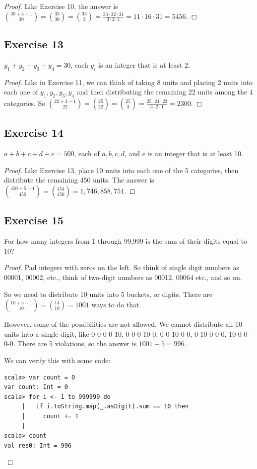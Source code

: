 \documentclass[14pt]{extarticle}
\begin{document}
\begin{proof}
     Like Exercise 10, the answer is \(\binom{30+4-1}{30} = \binom{33}{30} = \binom{33}{3} = \frac{33 \cdot 32 \cdot 31}{3
          \cdot 2 \cdot 1} = 11 \cdot 16 \cdot 31 = 5456\).
\end{proof}

\subsection{Exercise 13}
\(y_1 + y_2 + y_3 + y_4 = 30\), each \(y_i\) is an integer that is at least 2.

\begin{proof}
     Like in Exercise 11, we can think of taking 8 units and placing 2 units into each one of \(y_1,y_2,y_3,y_4\) and then
     distributing the remaining 22 units among the 4 categories. So \(\binom{22+4-1}{22} = \binom{25}{22} = \binom{25}{3} =
     \frac{25 \cdot 24 \cdot 23}{3 \cdot 2 \cdot 1} = 2300\).
\end{proof}

\subsection{Exercise 14}
\(a + b + c + d + e = 500\), each of \(a, b, c, d\), and \(e\) is an integer that is at least 10.

\begin{proof}
     Like Exercise 13, place 10 units into each one of the 5 categories, then distribute the remaining 450 units. The
     answer is \(\binom{450+5-1}{450} = \binom{454}{450} = 1,746,858,751\).
\end{proof}

\subsection{Exercise 15}
For how many integers from 1 through 99,999 is the sum of their digits equal to 10?

\begin{proof}
     Pad integers with zeros on the left. So think of single digit numbers as 00001, 00002, etc., think of two-digit numbers as
     00012, 00064 etc., and so on.

     So we need to distribute 10 units into 5 buckets, or digits. There are \(\binom{10+5-1}{10} = \binom{14}{10} = 1001\) ways
     to do that.

     However, some of the possibilities are not allowed. We cannot distribute all 10 units into a single digit, like 0-0-0-0-10,
     0-0-0-10-0, 0-0-10-0-0, 0-10-0-0-0, 10-0-0-0-0. There are 5 violations, so the answer is \(1001-5 = 996\).

     We can verify this with some code:
     \begin{verbatim}
scala> var count = 0
var count: Int = 0
scala> for i <- 1 to 999999 do
     |   if i.toString.map(_.asDigit).sum == 10 then
     |     count += 1
     |
scala> count
val res0: Int = 996
\end{verbatim}
\end{proof}
\end{document}

